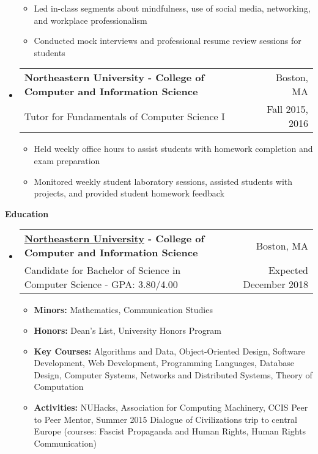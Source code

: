 \documentclass[letterpaper,10pt]{article}
\makeatletter
\newcommand{\resitem}[1]{\item #1 \vspace{-2pt}}
\newcommand{\resheading}[1]{{\large \colorbox{mygrey}{\begin{minipage}{\textwidth}{\textbf{#1 \vphantom{p\^{E}}}}\end{minipage}}}}
\newcommand{\ressubheading}[4]{
\begin{tabular*}{6.8in}{l@{\extracolsep{\fill}}r}
		\textbf{#1} & #2 \\
		\small{#3} & \small{#4} \\
\end{tabular*}\vspace{-6pt}}
\makeatother
\begin{document}
\begin{itemize}[leftmargin=*]
{\begin{itemize}
			\resitem{Led in-class segments about mindfulness, use of social media, networking, and workplace professionalism}
			\resitem{Conducted mock interviews and professional resume review sessions for students}
	\end{itemize}}
	\item[]
	\ressubheading{Northeastern University - \small{College of Computer and Information Science}}{Boston, MA}{Tutor for Fundamentals of Computer Science I}{Fall 2015, 2016}
	{\footnotesize
		\begin{itemize}
			\resitem{Held weekly office hours to assist students with homework completion and exam preparation}
			\resitem{Monitored weekly student laboratory sessions, assisted students with projects, and provided student homework feedback}
	\end{itemize}}
\end{itemize}

\resheading{Education}
	\begin{itemize}[leftmargin=*]
		\item[]
			\ressubheading{\href{http://www.northeastern.edu}{Northeastern University} - College of Computer and Information Science}{Boston, MA}{{Candidate for Bachelor of Science in Computer Science - }{GPA: 3.80/4.00}}{Expected December 2018}
				{ \footnotesize
				\begin{itemize}
					\resitem{\textbf{Minors:} Mathematics, Communication Studies}
					\resitem{\textbf{Honors:} Dean's List, University Honors Program}
					\resitem{\textbf{Key Courses:} Algorithms and Data, Object-Oriented Design, Software Development, Web Development, Programming Languages, Database Design, Computer Systems, Networks and Distributed Systems, Theory of Computation}
					\resitem{\textbf{Activities:} NUHacks, Association for Computing Machinery, CCIS Peer to Peer Mentor, Summer 2015 Dialogue of Civilizations trip to central Europe (courses: Fascist Propaganda and Human Rights, Human Rights Communication)}
				\end{itemize}}
	\end{itemize}
\end{document}
